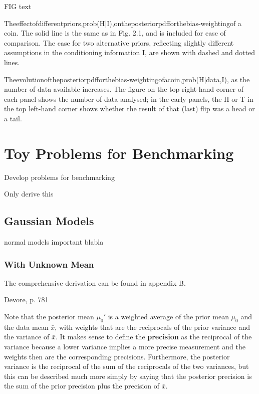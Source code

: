 FIG text 

Theeffectofdifferentpriors,prob(H|I),ontheposteriorpdfforthebias-weightingof a coin. The solid line is the same as in Fig. 2.1, and is included for ease of comparison. The case for two alternative priors, reflecting slightly different assumptions in the conditioning information I, are shown with dashed and dotted lines.

Theevolutionoftheposteriorpdfforthebias-weightingofacoin,prob(H|{data},I), as the number of data available increases. The figure on the top right-hand corner of each panel shows the number of data analysed; in the early panels, the H or T in the top left-hand corner shows whether the result of that (last) flip was a head or a tail.










\section{Toy Problems for Benchmarking}\label{sec:toy_problems}

Develop problems for benchmarking



Only derive this

\subsection{Gaussian Models}\label{sec:gaussian_models}

normal models important blabla

\subsubsection{With Unknown Mean}

The comprehensive derivation can be found in appendix B. 

Devore, p. 781 

Note that the posterior mean $\mu_0'$ is a weighted average of the prior mean $\mu_0$ and the data mean $\bar{x}$, with weights that are the reciprocals of the prior variance and the variance of $\bar{x}$. It makes sense to define the \textbf{precision} as the reciprocal of the variance because a lower variance implies a more precise measurement and the weights then are the corresponding precisions. Furthermore, the posterior variance is the reciprocal of the sum of the reciprocals of the two variances, but this can be described much more simply by saying that the posterior precision is the sum of the prior precision plus the precision of $\bar{x}$. 

